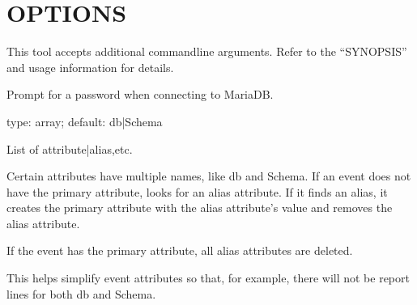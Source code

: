 \documentclass[letterpaper,10pt,english]{sphinxmanual}
\begin{document}
\section{OPTIONS}
\label{\detokenize{mariadb-query-digest:options}}
This tool accepts additional command\sphinxhyphen{}line arguments.  Refer to the
“SYNOPSIS” and usage information for details.

\begin{fulllineitems}
\label{\detokenize{mariadb-query-digest:cmdoption-mariadb-query-digest-ask-pass}}
Prompt for a password when connecting to MariaDB.

\end{fulllineitems}


\begin{fulllineitems}
\label{\detokenize{mariadb-query-digest:cmdoption-mariadb-query-digest-attribute-aliases}}
type: array; default: db|Schema

List of attribute|alias,etc.

Certain attributes have multiple names, like db and Schema.  If an event does
not have the primary attribute,  looks for an alias attribute.
If it finds an alias, it creates the primary attribute with the alias
attribute’s value and removes the alias attribute.

If the event has the primary attribute, all alias attributes are deleted.

This helps simplify event attributes so that, for example, there will not
be report lines for both db and Schema.

\end{fulllineitems}
\end{document}
